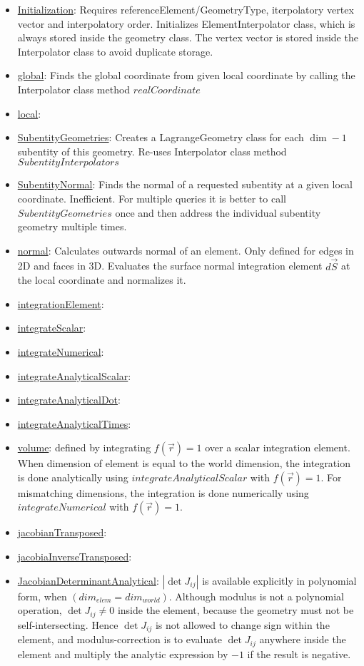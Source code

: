 \begin{itemize}
\item \uline{Initialization}: Requires referenceElement/GeometryType, iterpolatory vertex vector and interpolatory order. Initializes ElementInterpolator class, which is always stored inside the geometry class. The vertex vector is stored inside the Interpolator class to avoid duplicate storage. \\
\item \uline{global}: Finds the global coordinate from given local coordinate by calling the Interpolator class method $realCoordinate$
\item \uline{local}:
\item \uline{SubentityGeometries}: Creates a LagrangeGeometry class for each $\dim-1$ subentity of this geometry. Re-uses Interpolator class method $SubentityInterpolators$
\item \uline{SubentityNormal}: Finds the normal of a requested subentity at a given local coordinate. Inefficient. For multiple queries it is better to call $SubentityGeometries$ once and then address the individual subentity geometry multiple times.
\item \uline{normal}: Calculates outwards normal of an element. Only defined for edges in 2D and faces in 3D. Evaluates the surface normal integration element $d\vec{S}$ at the local coordinate and normalizes it.
\item \uline{integrationElement}:
\item \uline{integrateScalar}:
\item \uline{integrateNumerical}:
\item \uline{integrateAnalyticalScalar}:
\item \uline{integrateAnalyticalDot}:
\item \uline{integrateAnalyticalTimes}:
\item \uline{volume}: defined by integrating $f(\vec{r}) = 1$ over a scalar integration element. When dimension of element is equal to the world dimension, the integration is done analytically using $integrateAnalyticalScalar$ with $f(\vec{r}) = 1$. For mismatching dimensions, the integration is done numerically using $integrateNumerical$ with $f(\vec{r}) = 1$. 
\item \uline{jacobianTransposed}:
\item \uline{jacobiaInverseTransposed}:
\item \uline{JacobianDeterminantAnalytical}: $|\det J_{ij}|$ is available explicitly in polynomial form, when $(dim_{elem} = dim_{world})$. Although modulus is not a polynomial operation, $\det J_{ij} \neq 0$ inside the element, because the geometry must not be self-intersecting. Hence $\det J_{ij}$ is not allowed to change sign within the element, and modulus-correction is to evaluate $\det J_{ij}$ anywhere inside the element and multiply the analytic expression by $-1$ if the result is negative.

\end{itemize}
